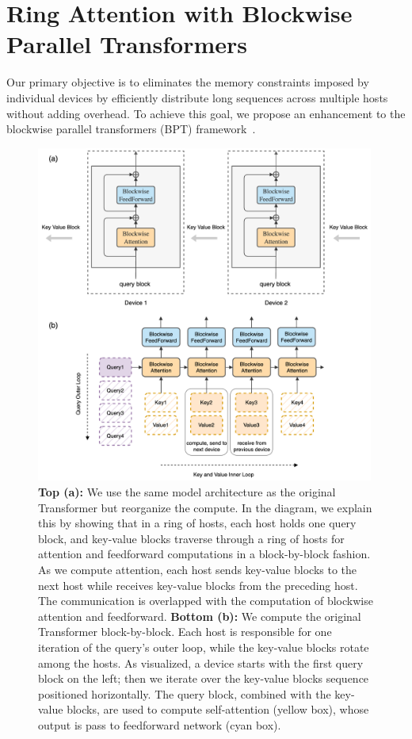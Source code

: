 \documentclass{article}
\begin{document}
\section{Ring Attention with Blockwise Parallel Transformers}
Our primary objective is to eliminates the memory constraints imposed by individual devices by efficiently distribute long sequences across multiple hosts without adding overhead. To achieve this goal, we propose an enhancement to the blockwise parallel transformers (BPT) framework~\citep{liu2023blockwise}.
\begin{figure}[!tb]
    \centering
    \label{fig:ring}
    \includegraphics[width=0.99\textwidth]{figures/merged.png}
    \vspace{-1em}
    \caption{\textbf{Top (a):} We use the same model architecture as the original Transformer but reorganize the compute.
    In the diagram, we explain this by showing that in a ring of hosts, each host holds one query block, and key-value blocks traverse through a ring of hosts for attention and feedforward computations in a block-by-block fashion.
    As we compute attention, each host sends key-value blocks to the next host while receives key-value blocks from the preceding host. The communication is overlapped with the computation of blockwise attention and feedforward.
    \textbf{Bottom (b):} We compute the original Transformer block-by-block.
    Each host is responsible for one iteration of the query's outer loop, while the key-value blocks rotate among the hosts. As visualized, a device starts with the first query block on the left; then we iterate over the key-value blocks sequence positioned horizontally.
    The query block, combined with the key-value blocks, are used to compute self-attention (yellow box), whose output is pass to feedforward network (cyan box).
    }
    \vspace{-1.2em}
\end{figure}
\end{document}
